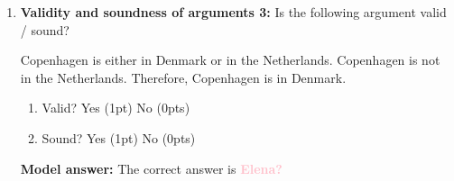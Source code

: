 \documentclass[a4,11pt]{article}
\newcommand{\jt}[1]{\textbf{\textcolor{Pink}{#1}}}
\begin{document}
\begin{enumerate}[leftmargin = 12pt]
\item {\bf Validity and soundness of arguments 3:} Is the following argument valid / sound?
\begin{exe}
\ex
\begin{xlist}
\ex Copenhagen is either in Denmark or in the Netherlands.
\ex Copenhagen is not in the Netherlands.
\ex Therefore, Copenhagen is in Denmark.
\end{xlist}
\end{exe}
 \begin{enumerate}[noitemsep]
    \item Valid? Yes (1pt) No (0pts)
    \item Sound? Yes (1pt) No (0pts)
\end{enumerate}

 {\bf Model answer:} The correct answer is \jt{Elena?}
 


\end{enumerate}
\end{document}
